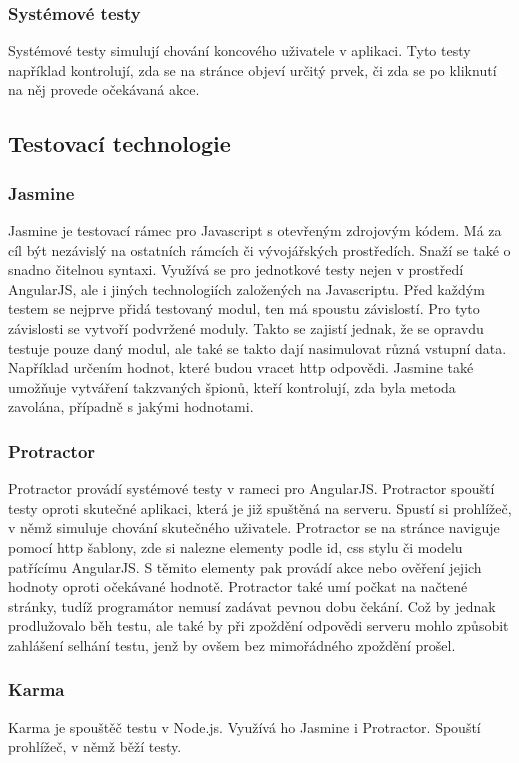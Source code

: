 \documentclass[czech,master,public,dept460,male,cpdeclaration,twoside]{diploma}
\begin{document}
\subsubsection{Systémové testy}
Systémové testy simulují chování koncového uživatele v aplikaci. Tyto testy například kontrolují, zda se na stránce objeví určitý prvek, či zda se po kliknutí na něj provede očekávaná akce.

\subsection{Testovací technologie}
\subsubsection{Jasmine}
Jasmine je testovací rámec pro Javascript s otevřeným zdrojovým kódem. Má za cíl být nezávislý na ostatních rámcích či vývojářských prostředích. Snaží se také o snadno čitelnou syntaxi. Využívá se pro jednotkové testy nejen v prostředí AngularJS, ale i jiných technologiích založených na Javascriptu. Před každým testem se nejprve přidá testovaný modul, ten má spoustu závislostí. Pro tyto závislosti se vytvoří podvržené moduly. Takto se zajistí jednak, že se opravdu testuje pouze daný modul, ale také se takto dají nasimulovat různá vstupní data. Například určením hodnot, které budou vracet http odpovědi. Jasmine také umožňuje vytváření takzvaných špionů, kteří kontrolují, zda byla metoda zavolána, případně s jakými hodnotami. \cite{testingANG}

\subsubsection{Protractor}
Protractor provádí systémové testy v rameci pro AngularJS. Protractor spouští testy oproti skutečné aplikaci, která je již spuštěná na serveru. Spustí si prohlížeč, v němž simuluje chování skutečného uživatele. Protractor se na stránce naviguje pomocí http šablony, zde si nalezne elementy podle id, css stylu či modelu patřícímu AngularJS. S těmito elementy pak provádí akce nebo ověření jejich hodnoty oproti očekávané hodnotě. Protractor také umí počkat na načtené stránky, tudíž programátor nemusí zadávat pevnou dobu čekání. Což by jednak prodlužovalo běh testu, ale také by při zpoždění odpovědi serveru mohlo způsobit zahlášení selhání testu, jenž by ovšem bez mimořádného zpoždění prošel. \cite{testingANG}

\subsubsection{Karma}
Karma je spouštěč testu v Node.js. Využívá ho Jasmine i Protractor. Spouští prohlížeč, v němž běží testy.
\end{document}
